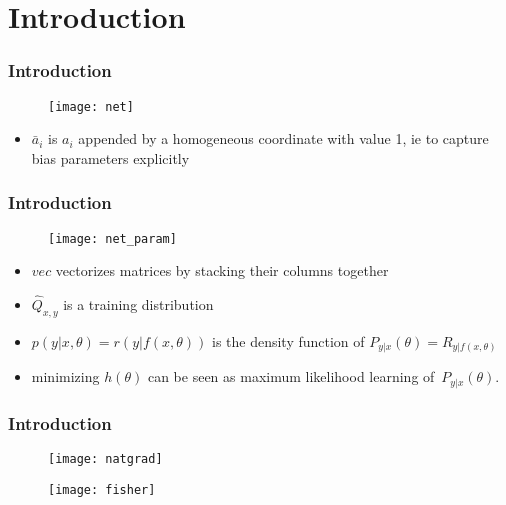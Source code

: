 \section{Introduction}

\begin{frame}
\frametitle{Introduction}

\begin{figure}
    \centering
    \texttt{[image: net]}
\end{figure}

\begin{itemize}
    \item $\bar{a}_i$ is $a_i$ appended by a homogeneous coordinate with value 1, ie
            to capture bias parameters explicitly
\end{itemize}
\end{frame}

\begin{frame}
\frametitle{Introduction}

\begin{figure}
    \centering
    \texttt{[image: net\_param]}
\end{figure}

\begin{itemize}
    \item $vec$ vectorizes matrices by stacking their columns together
    \item $\hat{Q}_{x, y}$ is a training distribution
    \item $p(y|x, \theta) = r(y|f(x, \theta))$ is the density function of $P_{y|x}(\theta) = R_{y|f(x,\theta)}$
    \item minimizing $h(\theta)$ can be seen as maximum likelihood learning of~$P_{y|x}(\theta)$.
\end{itemize}

\end{frame}

\begin{frame}
\frametitle{Introduction}
\begin{figure}
    \centering
    \texttt{[image: natgrad]}
\end{figure}

\begin{figure}
    \centering
    \texttt{[image: fisher]}
\end{figure}

\end{frame}
